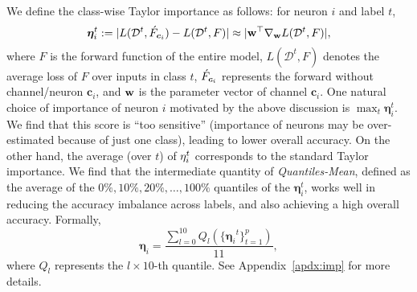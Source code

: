 We define the class-wise Taylor importance as follows: for neuron $i$ and label $t$,
\begin{equation}
    {\bm \eta}_i^{t} := |L(\mathcal{D}^{t}, \Acute{F}_{\boldsymbol{c}_i}) - L(\mathcal{D}^{t}, F)|\approx |\w^\top \nabla_{\w} L(\mathcal{D}^{t}, F)|, \label{eq:qmtaylor_label}
\end{equation}
where $F$ is the forward function of the entire model, $L(\mathcal{D}^{t}, F)$ denotes the average loss of $F$ over inputs in class $t$, $\Acute{F}_{\boldsymbol{c}_i}$ represents the forward without channel/neuron $\boldsymbol{c}_i$, and ${\mathbf{w}}$ is the parameter vector of channel $\boldsymbol{c}_i$. One natural choice of importance of neuron $i$ motivated by the above discussion is $\max_t {\bm \eta}_i^t$. We find that this score is ``too sensitive'' (importance of neurons may be over-estimated because of just one class), leading to lower overall accuracy. On the other hand, the average (over $t$) of ${\bf \eta}_i^t$ corresponds to the standard Taylor importance. We find that the intermediate quantity of \emph{Quantiles-Mean}, defined as the average of the $0\%, 10\%, 20\%, \dots, 100\%$ quantiles of the ${\bm \eta}_i^t$, works well in reducing the accuracy imbalance across labels, and also achieving a high overall accuracy. Formally,
\begin{equation}
    {\bm \eta}_i=\frac{\sum_{l=0}^{10}Q_l(\{{\bm \eta_i}^{t}\}_{t=1}^{p})}{11},\label{eq:qmtaylor_mean}
\end{equation}
where $Q_l$ represents the $l \times 10$-th quantile.   %
See Appendix~\ref{apdx:imp} for more details. %

